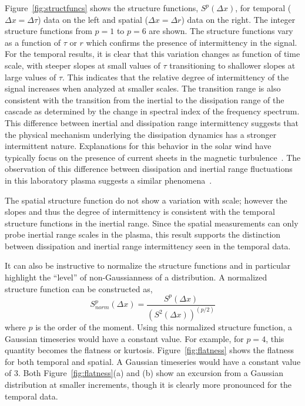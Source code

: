 \documentclass[aps,prl,amsmath,amssymb,reprint,superscriptaddress]{revtex4-1} %
\begin{document}
Figure~\ref{fig:structfuncs} shows the structure functions, $S^{p}(\Delta x)$, for temporal ($\Delta x = \Delta \tau$) data on the left and spatial ($\Delta x = \Delta r$) data on the right. The integer structure functions from $p=1$ to $p=6$ are shown. The structure functions vary as a function of $\tau$ or $r$ which confirms the presence of intermittency in the signal. For the temporal results, it is clear that this variation changes as function of time scale, with steeper slopes at small values of $\tau$ transitioning to shallower slopes at large values of $\tau$. This indicates that the relative degree of intermittency of the signal increases when analyzed at smaller scales. The transition range is also consistent with the transition from the inertial to the dissipation range of the cascade as determined by the change in spectral index of the frequency spectrum. This difference between inertial and dissipation range intermittency suggests that the physical mechanism underlying the dissipation dynamics has a stronger intermittent nature. Explanations for this behavior in the solar wind have typically focus on the presence of current sheets in the magnetic turbulence~\cite{osman2014}. The observation of this difference between dissipation and inertial range fluctuations in this laboratory plasma suggests a similar phenomena~\cite{schaffner2014b}. 

The spatial structure function do not show a variation with scale; however the slopes and thus the degree of intermittency is consistent with the temporal structure functions in the inertial range. Since the spatial measurements can only probe inertial range scales in the plasma, this result supports the distinction between dissipation and inertial range intermittency seen in the temporal data.

It can also be instructive to normalize the structure functions and in particular highlight the ``level'' of non-Gaussianness of a distribution. A normalized structure function can be constructed as,
\begin{equation}
S_{norm}^{p}(\Delta x) = \frac{S^{p}(\Delta x)}{(S^2(\Delta x))^{(p/2)}}
\label{eq:normstructfunc}
\end{equation}
where $p$ is the order of the moment. Using this normalized structure function, a Gaussian timeseries would have a constant value. For example, for $p=4$, this quantity becomes the flatness or kurtosis. Figure~\ref{fig:flatness} shows the flatness for both temporal and spatial. A Gaussian timeseries would have a constant value of 3. Both Figure~\ref{fig:flatness}(a) and (b) show an excursion from a Gaussian distribution at smaller increments, though it is clearly more pronounced for the temporal data.
\end{document}
